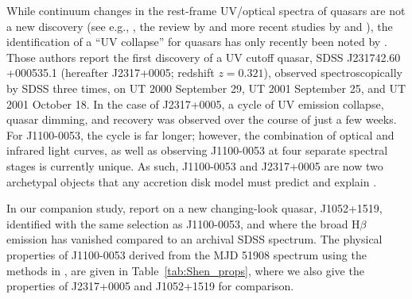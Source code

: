 \documentclass[a4paper,fleqn,usenatbib]{mnras}
\begin{document}
While continuum changes in the rest-frame UV/optical spectra of
quasars are not a new discovery (see e.g., \citealt{Clavel1991}, the
review by \citealt{Ulrich1997} and more recent studies by
\citealt{VandenBerk2004, Pereyra2006, MacLeod2010} and
\citealt{Guo2016b}), the identification of a ``UV collapse'' for
quasars has only recently been noted by \cite{Guo2016}. Those
authors report the first discovery of a UV cutoff quasar, SDSS
J231742.60 +000535.1 (hereafter J2317+0005; redshift $z = 0.321$),
observed spectroscopically by SDSS three times, on UT 2000 September 29, UT 2001
September 25, and UT 2001 October 18. In the case of J2317+0005, a
cycle of UV emission collapse, quasar dimming, and recovery was
observed over the course of just a few weeks. For J1100-0053, the
cycle is far longer; however, the combination of optical and infrared
light curves, as well as observing J1100-0053 at four separate
spectral stages is currently unique. As such, J1100-0053 and
J2317+0005 are now two archetypal objects that any accretion disk
model must predict and explain \citep[e.g.,][]{Lawrence2018}.

In our companion study, \citet{Stern2018} report on a new
changing-look quasar, J1052+1519, identified with the same selection
as J1100-0053, and where the broad H$\beta$ emission has vanished
compared to an archival SDSS spectrum. The physical properties of
J1100-0053 derived from the MJD 51908 spectrum using the methods in
\citet{Shen2011}, are given in Table~\ref{tab:Shen_props}, where we
also give the properties of J2317+0005 \citep{Guo2016} and J1052+1519
\citep{Stern2018} for comparison.
\end{document}
